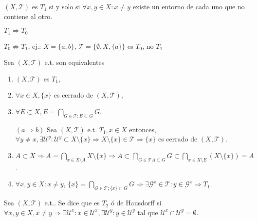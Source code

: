 \begin{obs}
  $( X, \mathcal{T} )$ es $T_{1}$ si y solo si $\forall x, y \in X : x \neq y$ existe un entorno de cada uno que no contiene al otro.
\end{obs}

\begin{obs}
  $T_{1} \Rightarrow T_{0}$
\end{obs}

\begin{obs}
  $T_{0} \not \Rightarrow T_{1}$, ej.: $X = \{ a, b \}$, $\mathcal{T} = \{ \emptyset, X, \{ a \} \}$ es $T_{0}$, no $T_{1}$
\end{obs}

\begin{prop}
  Sea $( X, \mathcal{T} )$ e.t. son equivalentes
  \begin{enumerate}[label=(\roman*)]
    \item $( X, \mathcal{T} )$ es $T_{1}$,
    \item $\forall x \in X, \{ x \}$ es cerrado de $( X, \mathcal{T} )$,
    \item $\forall E \subset X, E = \bigcap_{G \in \mathcal{T}: E \subset G} G$.
  \end{enumerate}
\end{prop}

\begin{dem}
  \begin{enumerate}[label=(\roman*)]
    \item []
    \item [$  (a \Rightarrow b)$] Sea $( X, \mathcal{T} )$ e.t. $T_{1}, x \in X$ entonces, $\forall y \neq x, \exists \mathcal{U}^{y}: \mathcal{U}^{y} \subset X \setminus \{ x \} \Rightarrow X \setminus \{ x \} \in \mathcal{T} \Rightarrow \{ x \}$ es cerrado de $( X, \mathcal{T} )$.
    \item $A \subset X \Rightarrow A = \bigcap_{x \in X \setminus A} X \setminus \{ x \} \Rightarrow A \subset \bigcap_{G \in \mathcal{T} A \subset G} G \subset \bigcap_{x \in X \setminus E} (X \setminus \{ x \}) = A$.
    \item $\forall x, y \in X : x \neq y$, $\{ x \} = \bigcap_{G \in \mathcal{T}; \{ x \} \subset G} G \Rightarrow \exists \mathcal{G}^{x} \in \mathcal{T} : y \in \mathcal{G}^{x} \Rightarrow T_{1}$.
  \end{enumerate}
\end{dem}

\begin{defn}
  Sea $( X, \mathcal{T} )$ e.t.. Se dice que es $T_{2}$ ó de Hausdorff si $\forall x, y \in X, x \neq y \Rightarrow \exists \mathcal{U}^{x}: x \in \mathcal{U}^{x}, \exists \mathcal{U}^{y}: y \in \mathcal{U}^{y}$ tal que $\mathcal{U}^{x} \cap \mathcal{U}^{y} = \emptyset$.
\end{defn}

